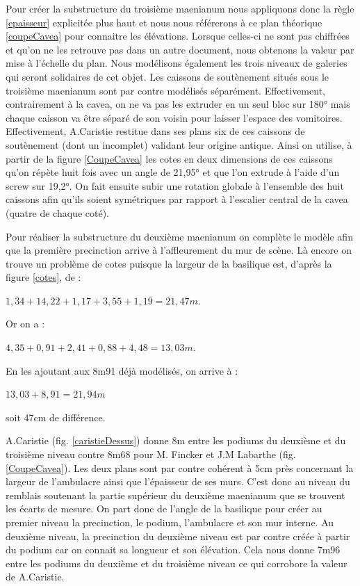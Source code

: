 Pour créer la substructure du troisième maenianum nous appliquons donc la règle \ref{epaisseur} explicitée plus haut et nous nous référerons à ce plan théorique \ref{coupeCavea} pour connaitre les élévations. Lorsque celles-ci ne sont pas chiffrées et qu'on ne les retrouve pas dans un autre document, nous obtenons la valeur par mise à l'échelle du plan. Nous modélisons également les trois niveaux de galeries qui seront solidaires de cet objet. Les caissons de soutènement situés sous le troisième \gls{maenianum} sont par contre modélisés séparément. Effectivement, contrairement à la cavea, on ne va pas les extruder en un seul bloc sur 180° mais chaque caisson va être séparé de son voisin pour laisser l'espace des vomitoires. Effectivement, A.Caristie restitue dans ses plans six de ces caissons de soutènement (dont un incomplet) validant leur origine antique. Ainsi on utilise, à partir de la figure \ref{CoupeCavea} les cotes en deux dimensions de ces caissons qu'on répète huit fois avec un angle de 21,95° et que l'on extrude à l'aide d'un \gls{screw} sur 19,2°. On fait ensuite subir une rotation globale à l'ensemble des huit caissons afin qu'ils soient symétriques par rapport à l'escalier central de la cavea (quatre de chaque coté). 

Pour réaliser la substructure du deuxième maenianum on complète le modèle afin que la première precinction arrive à l'affleurement du mur de scène. Là encore on trouve un problème de cotes puisque la largeur de la basilique est, d'après la figure \ref{cotes}, de :
\begin{center}
$1,34+14,22+1,17+3,55+1,19=21,47m$.
\end{center}
Or on a : 
\begin{center}
$4,35+0,91+2,41+0,88+4,48=13,03m$.
\end{center}
En les ajoutant aux 8m91 déjà modélisés, on arrive à :
\begin{center}
$13,03+8,91=21,94m$
\end{center}
soit 47cm de différence. 


A.Caristie (fig. \ref{caristieDessus}) donne 8m entre les podiums du deuxième et du troisième niveau contre 8m68 pour M. Fincker et J.M Labarthe (fig. \ref{CoupeCavea}). Les deux plans sont par contre cohérent à 5cm près concernant la largeur de l'ambulacre ainsi que l'épaisseur de ses murs. C'est donc au niveau du remblais soutenant la partie supérieur du deuxième maenianum que se trouvent les écarts de mesure. On part donc de l'angle de la basilique pour créer au premier niveau la precinction, le podium, l'ambulacre et son mur interne. Au deuxième niveau, la precinction du deuxième niveau est par contre créée à partir du podium car on connait sa longueur et son élévation. Cela nous donne 7m96 entre les podiums du deuxième et du troisième niveau ce qui corrobore la valeur de A.Caristie.

